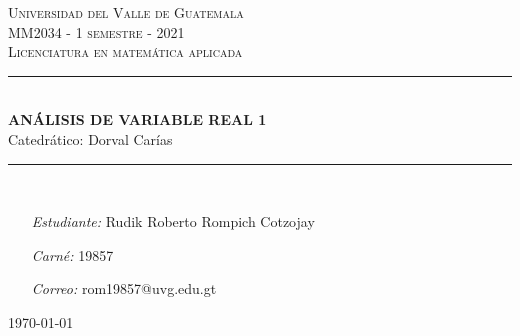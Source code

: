 \begin{titlepage}
\thispagestyle{empty}
\newcommand{\HRule}{\rule{\linewidth}{0.5mm}}
\hspace{1cm}
\center

\textsc{\huge Universidad del Valle de Guatemala}\\[2.0cm]
\textsc{\Large MM2034 - 1 semestre - 2021}\\[0.8cm]
\MSonehalfspacing
\textsc{Licenciatura en matemática aplicada}\\[1.0cm]

\HRule\\[1.4cm]
\MSdoublespacing
{ \huge \bfseries ANÁLISIS DE VARIABLE REAL 1}\\[0.2cm]
{ \large Catedrático: Dorval Carías}\\[0.3cm] %
\HRule \\[2.4cm]
\MSonehalfspacing

\begin{minipage}[t]{0.8\textwidth}
	\begin{itemize}
	\item[\emph{Estudiante:}] Rudik Roberto Rompich Cotzojay
	\item[\emph{Carné:}] 19857
	\item[\emph{Correo:}] rom19857@uvg.edu.gt
	\end{itemize}
\end{minipage}

\vspace{2.9cm}

\flushright \today
\end{titlepage}
\restoregeometry

\tableofcontents
{}
\thispagestyle{empty}

\MSonehalfspacing
\newpage
\setcounter{page}{1}
\pagestyle{fancy}